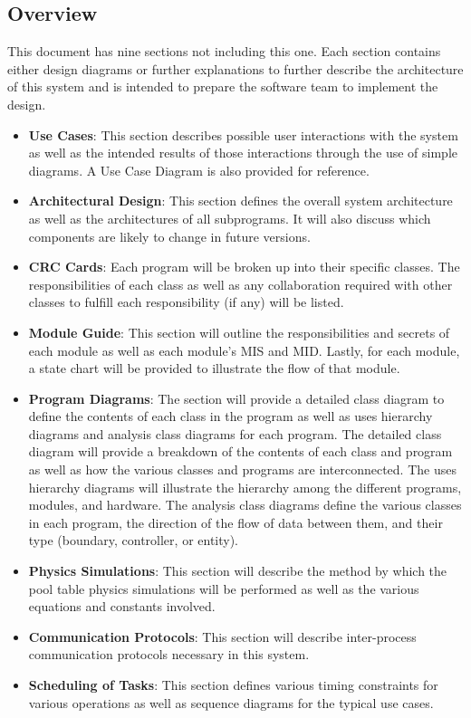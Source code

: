 \documentclass[titlepage]{article}
\begin{document}
\subsection{Overview}
This document has nine sections not including this one. Each section contains either design diagrams or further explanations to further describe the architecture of this system and is intended to prepare the software team to implement the design.\\
\begin{itemize}
	\item \textbf{Use Cases}: This section describes possible user interactions with the system as well as the intended results of those interactions through the use of simple diagrams. A Use Case Diagram is also provided for reference.\\
	\item \textbf{Architectural Design}: This section defines the overall system architecture as well as the architectures of all subprograms. It will also discuss which components are likely to change in future versions.\\
	\item \textbf{CRC Cards}: Each program will be broken up into their specific classes. The responsibilities of each class as well as any collaboration required with other classes to fulfill each responsibility (if any) will be listed.\\
	\item \textbf{Module Guide}: This section will outline the responsibilities and secrets of each module as well as each module's MIS and MID. Lastly, for each module, a state chart will be provided to illustrate the flow of that module.\\
	\item \textbf{Program Diagrams}: The section will provide a detailed class diagram to define the contents of each class in the program as well as uses hierarchy diagrams and analysis class diagrams for each program. The detailed class diagram will provide a breakdown of the contents of each class and program as well as how the various classes and programs are interconnected. The uses hierarchy diagrams will illustrate the hierarchy among the different programs, modules, and hardware. The analysis class diagrams define the various classes in each program, the direction of the flow of data between them, and their type (boundary, controller, or entity).\\
	\item \textbf{Physics Simulations}: This section will describe the method by which the pool table physics simulations will be performed as well as the various equations and constants involved.\\
	\item \textbf{Communication Protocols}: This section will describe inter-process communication protocols necessary in this system.\\
	\item \textbf{Scheduling of Tasks}: This section defines various timing constraints for various operations as well as sequence diagrams for the typical use cases.\\
\end{itemize}
\newpage
\end{document}
